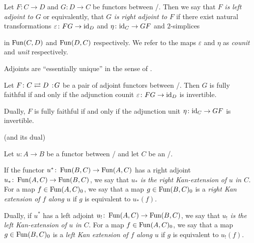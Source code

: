 \begin{definition}[Adjoints]
    Let $F\colon C\to D$ and $G\colon D\to C$ be functors between \inftycats/.
    Then we say that \emph{$F$ is left adjoint to $G$} or equivalently, that \emph{$G$ is right adjoint to $F$}
    if there exist natural transformations $\varepsilon\colon FG\to \text{id}_D$ and $\eta\colon\text{id}_C\to GF$ and $2$-simplices 
    \begin{center}
    \end{center}
    in $\operatorname{Fun}(C,D)$ and $\operatorname{Fun}(D,C)$ respectively.
    We refer to the maps $\varepsilon$ and $\eta$ as \emph{counit} and \emph{unit} respectively.
\end{definition}
\begin{remark}
    Adjoints are ``essentially unique'' in the sense of \cite[Proposition 6.1.9]{cisinski_2019}.
\end{remark}
\begin{corollary}\label{cor:CoUnitInvertibleFF}
    Let $F\colon C\rightleftarrows D\mkern+3mu:\mkern-3mu G$ be a pair of adjoint functors between \inftycats/.
    Then $G$ is fully faithful if and only if the adjunction counit $\varepsilon\colon FG\to \text{id}_D$ is invertible.

    Dually, $F$ is fully faithful if and only if the adjunction unit $\eta\colon\text{id}_C\to GF$ is invertible.
    \begin{reference}
        \cite[Corollary 6.2.2.13]{kerodon} (and its dual)
    \end{reference}
\end{corollary}
\begin{definition}
    Let $u\colon A\to B$ be a functor between \inftycats/ and let $C$ be an \inftycat/.
    
    If the functor $u^*\colon\operatorname{Fun}(B,C)\to\operatorname{Fun}(A,C)$ has a right adjoint $u_*\colon\operatorname{Fun}(A,C)\to\operatorname{Fun}(B,C)$, we say that \emph{$u_*$ is the right Kan-extension of $u$ in $C$}.
    For a map $f\in\operatorname{Fun}(A,C)_0$, we say that a map $g\in\operatorname{Fun}(B,C)_0$ is a \emph{right Kan extension of $f$ along $u$} if $g$ is equivalent to $u_*(f)$.

    Dually, if $u^*$ has a left adjoint $u_!\colon\operatorname{Fun}(A,C)\to\operatorname{Fun}(B,C)$, we say that \emph{$u_!$ is the left Kan-extension of $u$ in $C$}.
    For a map $f\in\operatorname{Fun}(A,C)_0$, we say that a map $g\in\operatorname{Fun}(B,C)_0$ is a \emph{left Kan extension of $f$ along $u$} if $g$ is equivalent to $u_!(f)$.
\end{definition}
